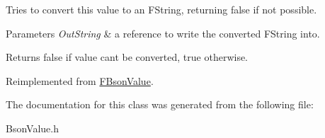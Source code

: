 Tries to convert this value to an F\+String, returning false if not possible.


\begin{DoxyParams}{Parameters}
{\em Out\+String} & a reference to write the converted F\+String into. \\
\hline
\end{DoxyParams}
\begin{DoxyReturn}{Returns}
false if value can\textquotesingle{}t be converted, true otherwise. 
\end{DoxyReturn}


Reimplemented from \mbox{\hyperlink{class_f_bson_value_aa52379f3d911ed0d5c8ded6e83ceecc0}{F\+Bson\+Value}}.



The documentation for this class was generated from the following file\+:\begin{DoxyCompactItemize}
\item 
Bson\+Value.\+h\end{DoxyCompactItemize}
